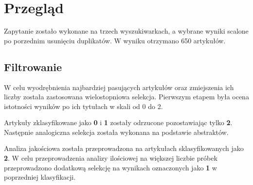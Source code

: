 \section{Przegląd}
Zapytanie zostało wykonane na trzech wyszukiwarkach, a wybrane wyniki scalone po porzednim usunięciu duplikatów. W wyniku otrzymano 650 artykułów.

\subsection{Filtrowanie}
W celu wyodrębnienia najbardziej pasujących artykułów oraz zmiejszenia ich liczby została zastosowana wielostopniowa selekcja. Pierwszym etapem była ocena istotności wyników po ich tytułach w skali od 0 do 2.

Artykuły zklasyfikowane jako {\bf0} i {\bf1} zostały odrzucone pozostawiając tylko {\bf2}. Następnie analogiczna selekcja została wykonana na podstawie abstraktów.

Analiza jakościowa została przeprowadzona na artykułach sklasyfikowanych jako \textbf{2}. W celu przeprowadzenia analizy ilościowej na większej liczbie próbek przeprowadzono dodatkową selekcję na wynikach oznaczonych jako \textbf{1} w poprzedniej klasyfikacji.

